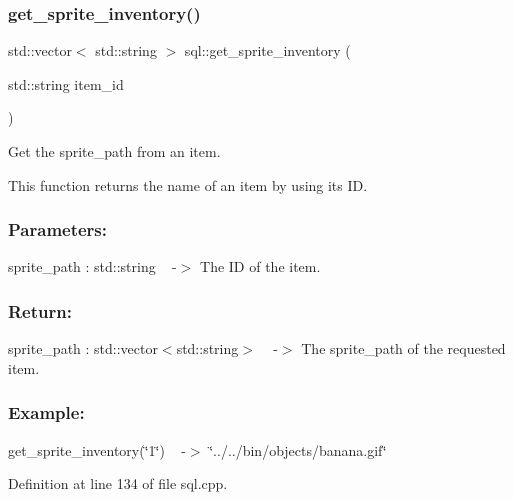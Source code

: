 \subsubsection{\texorpdfstring{get\+\_\+sprite\+\_\+inventory()}{get\_sprite\_inventory()}}
{\footnotesize\ttfamily std\+::vector$<$ std\+::string $>$ sql\+::get\+\_\+sprite\+\_\+inventory (\begin{DoxyParamCaption}\item[{std\+::string}]{item\+\_\+id }\end{DoxyParamCaption})}



Get the sprite\+\_\+path from an item. 

This function returns the name of an item by using its ID.~\newline
 \subsubsection*{Parameters\+: }

sprite\+\_\+path \+: std\+::string ~\newline
-\/$>$ The ID of the item.

\subsubsection*{Return\+: }

sprite\+\_\+path \+: std\+::vector$<$std\+::string$>$ ~\newline
-\/$>$ The sprite\+\_\+path of the requested item.

\subsubsection*{Example\+: }

get\+\_\+sprite\+\_\+inventory(\char`\"{}1\char`\"{}) ~\newline
-\/$>$ \char`\"{}../../bin/objects/banana.\+gif\char`\"{} 

Definition at line 134 of file sql.\+cpp.

